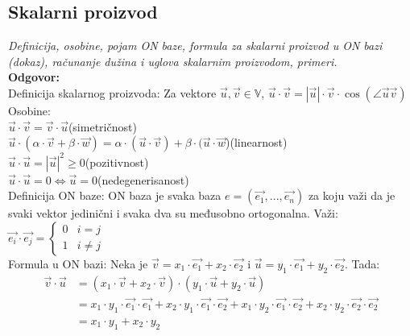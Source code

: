 \documentclass[12pt]{article}
\begin{document}
\subsection{Skalarni proizvod}
\textit{Definicija, osobine, pojam ON baze, formula za skalarni proizvod u ON
    bazi (dokaz), računanje dužina i uglova skalarnim proizvodom,
    primeri.}\\
\textbf{Odgovor:}\\
Definicija skalarnog proizvoda: Za vektore $\overrightarrow{u}, \overrightarrow{v}\in\mathbb{V}$, $\overrightarrow{u}\cdot\overrightarrow{v}=|\overrightarrow{u}|\cdot\overrightarrow{v}\cdot\cos(\angle{\overrightarrow{u}\overrightarrow{v}})$\\
Osobine:\\
$\overrightarrow{u}\cdot\overrightarrow{v}=\overrightarrow{v}\cdot\overrightarrow{u}$\hspace*{1cm}(simetričnost)\\
$\overrightarrow{u}\cdot(\alpha\cdot\overrightarrow{v}+\beta\cdot\overrightarrow{w})=\alpha\cdot(\overrightarrow{u}\cdot\overrightarrow{v})+\beta\cdot(\overrightarrow{u}\cdot\overrightarrow{w}$)\hspace*{1cm}(linearnost)\\
$\overrightarrow{u}\cdot\overrightarrow{u}=|\overrightarrow{u}|^2\geq0$\hspace*{1cm}(pozitivnost)\\
$\overrightarrow{u}\cdot\overrightarrow{u}=0\iff\overrightarrow{u}=0$\hspace*{1cm}(nedegenerisanost)\\
    Definicija ON baze: ON baza je svaka baza $e=(\overrightarrow{e_1}, ..., \overrightarrow{e_n})$ za koju važi
    da je svaki vektor jedinični i svaka dva su međusobno ortogonalna. Važi:
$\overrightarrow{e_i}\cdot\overrightarrow{e_j} = \begin{cases}
    0 & i=j     \\
    1 & i\neq j
\end{cases}$\\
    Formula u ON bazi:
    Neka je $\overrightarrow{v}=x_1\cdot\overrightarrow{e_1}+x_2\cdot\overrightarrow{e_2}$ i
$\overrightarrow{u}=y_1\cdot\overrightarrow{e_1}+y_2\cdot\overrightarrow{e_2}$.
    Tada:
    \begin{align*}
        \overrightarrow{v}\cdot\overrightarrow{u} & = (x_1\cdot\overrightarrow{v}+x_2\cdot\overrightarrow{v})\cdot(y_1\cdot\overrightarrow{u}+y_2\cdot\overrightarrow{u})                                                                                                                                                 \\
                                                  & = x_1\cdot y_1\cdot \overrightarrow{e_1}\cdot \overrightarrow{e_1}+x_2\cdot y_1\cdot \overrightarrow{e_1}\cdot \overrightarrow{e_2}+x_1\cdot y_2\cdot \overrightarrow{e_1}\cdot \overrightarrow{e_2}+x_2\cdot y_2\cdot \overrightarrow{e_2}\cdot \overrightarrow{e_2} \\
                                                  & = x_1\cdot y_1+x_2\cdot y_2
    \end{align*}
\end{document}
